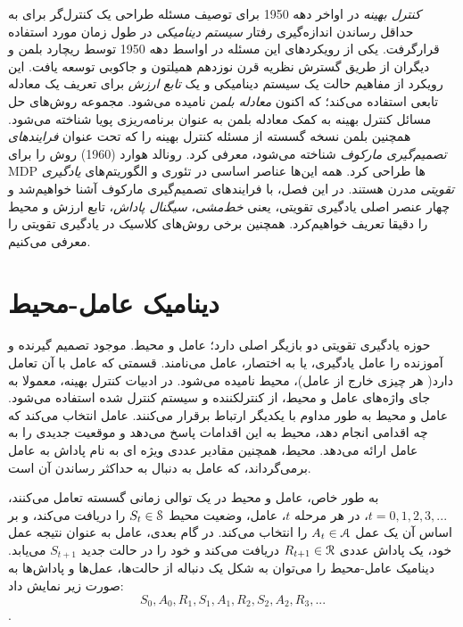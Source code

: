 
 \textit{کنترل بهینه}
در اواخر دهه 1950 برای توصیف مسئله طراحی یک کنترل‌گر برای به حداقل رساندن اندازه‌گیری رفتار \textit{سیستم دینامیکی} در طول زمان مورد استفاده قرارگرفت. یکی از رویکردهای این مسئله در اواسط دهه 1950 توسط ریچارد بلمن و دیگران از طریق گسترش نظریه قرن نوزدهم همیلتون و جاکوبی توسعه یافت. این رویکرد از مفاهیم حالت یک سیستم دینامیکی و یک \textit{تابع ارزش} برای تعریف یک معادله تابعی استفاده می‌کند؛ که اکنون \textit{معادله بلمن} نامیده می‌شود. مجموعه روش‌های حل مسائل کنترل بهینه به کمک معادله بلمن به عنوان برنامه‌ریزی پویا شناخته می‌شود. همچنین بلمن نسخه گسسته از مسئله کنترل بهینه را که تحت عنوان \textit{فرایندهای تصمیم‌گیری مارکوف} 
 شناخته می‌شود، معرفی کرد. رونالد هوارد (1960) روش
  را برای MDP‌ ها طراحی کرد. همه این‌ها عناصر اساسی در تئوری و الگوریتم‌های \textit{یادگیری تقویتی} مدرن هستند.
  در این فصل، با فرایندهای تصمیم‌گیری مارکوف آشنا خواهیم‌شد و چهار عنصر اصلی یادگیری تقویتی، یعنی \textit{خط‌مشی}، \textit{سیگنال پاداش}، تابع ارزش و محیط را دقیقا تعریف خواهیم‌کرد. همچنین برخی روش‌های کلاسیک در یادگیری تقویتی را معرفی می‌کنیم.

\section{دینامیک عامل-محیط}
حوزه یادگیری تقویتی  دو بازیگر اصلی دارد؛ عامل و محیط. موجود تصمیم گیرنده و آموزنده را عامل یادگیری، یا به اختصار، عامل می‌نامند. قسمتی که عامل با آن تعامل دارد(
هر چیزی خارج از عامل)، محیط نامیده می‌شود. در ادبیات کنترل بهینه، معمولا به جای واژه‌های عامل و محیط، از  کنترل\nf کننده 
 و سیستم کنترل شده  استفاده می‌شود.
 عامل و محیط به طور مداوم با یکدیگر ارتباط برقرار می‌کنند. عامل انتخاب می‌کند که چه اقدامی‌ انجام دهد، محیط به این اقدامات پاسخ می‌دهد و موقعیت جدیدی را به عامل ارائه می‌دهد.
محیط، همچنین مقادیر عددی ویژه ای به نام پاداش  به عامل برمی‌گرداند، که عامل به دنبال به حداکثر رساندن آن است. 

به طور خاص، عامل و محیط در یک توالی زمانی گسسته تعامل می‌کنند، 
$t = 0,1,2,3,...$،
در هر مرحله $t$، عامل، وضعیت محیط  
$S_t \in \EuScript{S}$
را دریافت می‌کند، و بر اساس آن یک عمل 
$A_t \in \EuScript{A}$
را انتخاب می‌کند. در گام بعدی، عامل به عنوان نتیجه عمل خود، یک پاداش عددی $R_{t+1} \in \EuScript{R}$ دریافت می‌کند و خود را در حالت جدید $S_{t+1}$ می‌یابد.
دینامیک عامل-محیط را می‌توان به شکل یک دنباله از حالت‌ها، عمل‌ها و پاداش‌ها به صورت زیر نمایش داد:
$$S_0, A_0, R_1, S_1, A_1, R_2, S_2, A_2, R_3, ...$$.

